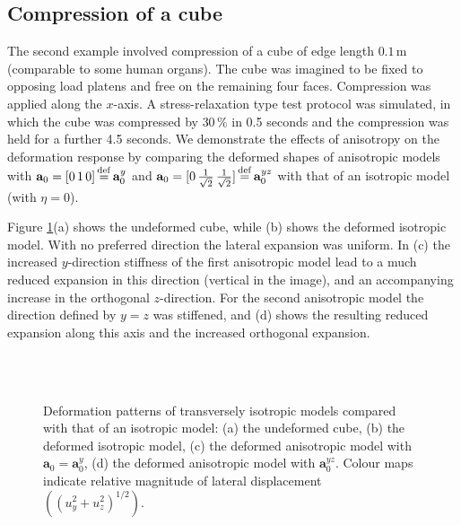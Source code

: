 	\subsection{Compression of a cube}
The second example involved compression of a cube of edge length $0.1\,$m (comparable to some human organs). The cube was imagined to be fixed to opposing load platens and free on the remaining four faces. Compression was applied along the $x$-axis. A stress-relaxation type test protocol was simulated, in which the cube was compressed by $30\, \%$ in 0.5 seconds and the compression was held for a further 4.5 seconds. We demonstrate the effects of anisotropy on the deformation response by comparing the deformed shapes of anisotropic models with $\mathbf{a}_0 = [0\, 1\, 0] \, {\buildrel\rm	def\over=} \, \mathbf{a}_0^y $ and $\mathbf{a}_0 = [0\, \frac{1}{\sqrt{2}} \, \frac{1}{\sqrt{2}}] \, {\buildrel\rm	def\over=} \, \mathbf{a}_0^{yz} $  with that of an isotropic model (with $\eta = 0$).

\bigskip

Figure \ref{chap6:fig-cubeAnisotropic}(a) shows the undeformed cube, while (b) shows the deformed isotropic model. With no preferred direction the lateral expansion was uniform. In (c) the increased $y$-direction stiffness of the first anisotropic model lead to a much reduced expansion in this direction (vertical in the image), and an accompanying increase in the orthogonal $z$-direction. For the second anisotropic model the direction defined by $y = z$ was stiffened, and (d) shows the resulting reduced expansion along this axis and the increased orthogonal expansion. 
%
\begin{figure}[ht]
\centering 
{}
\hspace{1cm}
 \\
\hspace{1cm}
 \\
\caption[Deformation patterns of transversely isotropic models compared with that of an isotropic model]{Deformation patterns of transversely isotropic models compared with that of an isotropic model: (a) the undeformed cube, (b) the deformed isotropic model, (c) the deformed anisotropic model with $ \mathbf{a}_0 = \mathbf{a}_0^y $, (d) the deformed anisotropic model with $\mathbf{a}_0^{yz}$. Colour maps indicate relative magnitude of lateral displacement  $((u_y^2 + u_z^2)^{1/2})$.}
\label{chap6:fig-cubeAnisotropic}
\end{figure}


